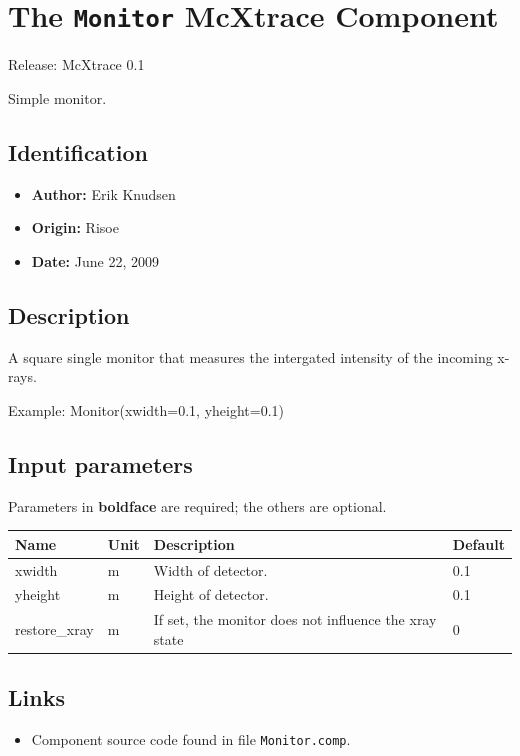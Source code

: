 \section{The \texttt{Monitor} McXtrace Component}
Release: McXtrace 0.1

Simple monitor.

\subsection*{Identification}
\begin{itemize}
  \item \textbf{Author:} Erik Knudsen
  \item \textbf{Origin:} Risoe
  \item \textbf{Date:} June 22, 2009
\end{itemize}

\subsection*{Description}
A square single monitor that measures the intergated intensity of the incoming x-rays.

Example: Monitor(xwidth=0.1, yheight=0.1)

\subsection*{Input parameters}
Parameters in \textbf{boldface} are required; the others are optional.

\begin{longtable}{p{}p{}p{}p{}}
\toprule
\textbf{Name} & \textbf{Unit} & \textbf{Description} & \textbf{Default} \\
\midrule
\endhead
xwidth & m & Width of detector. & 0.1 \\
yheight & m & Height of detector. & 0.1 \\
restore\_xray & m & If set, the monitor does not influence the xray state & 0 \\
\bottomrule
\end{longtable}

\subsection*{Links}
\begin{itemize}
  \item Component source code found in file \texttt{Monitor.comp}.
\end{itemize}
